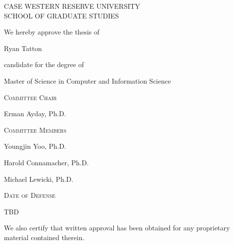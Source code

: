 \begin{center}
\large

\MakeUppercase{Case Western Reserve University \\ School of Graduate Studies}

\vspace{0.2in}

We hereby approve the thesis of

Ryan Tatton

candidate for the degree of

Master of Science in Computer and Information Science

\vspace{0.2in}

\textsc{Committee Chair}

Erman Ayday, Ph.D.

\vspace{0.2in}

\textsc{Committee Members}

Youngjin Yoo, Ph.D.

Harold Connamacher, Ph.D.

Michael Lewicki, Ph.D.

\vspace{0.2in}

\textsc{Date of Defense}

TBD %

\vspace{0.2in}

We also certify that written approval has been obtained for any proprietary
material contained therein.
\end{center}